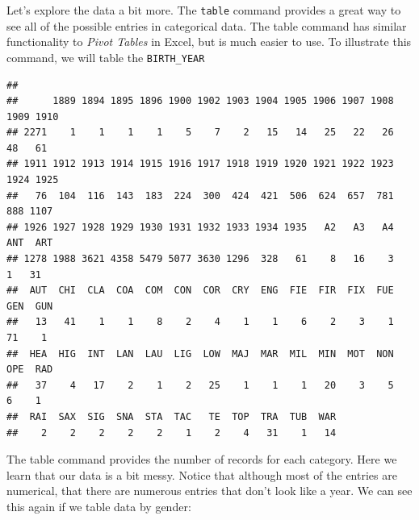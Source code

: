 \documentclass[]{book}
\newenvironment{Shaded}{\begin{snugshade}}{\end{snugshade}}
\newcommand{\KeywordTok}[1]{\textcolor[rgb]{0.13,0.29,0.53}{\textbf{{#1}}}}
\newcommand{\NormalTok}[1]{{#1}}
\begin{document}
Let's explore the data a bit more. The \texttt{table} command provides a
great way to see all of the possible entries in categorical data. The
table command has similar functionality to \emph{Pivot Tables} in Excel,
but is much easier to use. To illustrate this command, we will table the
\texttt{BIRTH\_YEAR}

\begin{Shaded}
\end{Shaded}

\begin{verbatim}
## 
##      1889 1894 1895 1896 1900 1902 1903 1904 1905 1906 1907 1908 1909 1910 
## 2271    1    1    1    1    5    7    2   15   14   25   22   26   48   61 
## 1911 1912 1913 1914 1915 1916 1917 1918 1919 1920 1921 1922 1923 1924 1925 
##   76  104  116  143  183  224  300  424  421  506  624  657  781  888 1107 
## 1926 1927 1928 1929 1930 1931 1932 1933 1934 1935   A2   A3   A4  ANT  ART 
## 1278 1988 3621 4358 5479 5077 3630 1296  328   61    8   16    3    1   31 
##  AUT  CHI  CLA  COA  COM  CON  COR  CRY  ENG  FIE  FIR  FIX  FUE  GEN  GUN 
##   13   41    1    1    8    2    4    1    1    6    2    3    1   71    1 
##  HEA  HIG  INT  LAN  LAU  LIG  LOW  MAJ  MAR  MIL  MIN  MOT  NON  OPE  RAD 
##   37    4   17    2    1    2   25    1    1    1   20    3    5    6    1 
##  RAI  SAX  SIG  SNA  STA  TAC   TE  TOP  TRA  TUB  WAR 
##    2    2    2    2    2    1    2    4   31    1   14
\end{verbatim}

The table command provides the number of records for each category. Here
we learn that our data is a bit messy. Notice that although most of the
entries are numerical, that there are numerous entries that don't look
like a year. We can see this again if we table data by gender:

\begin{Shaded}
\end{Shaded}
\end{document}
